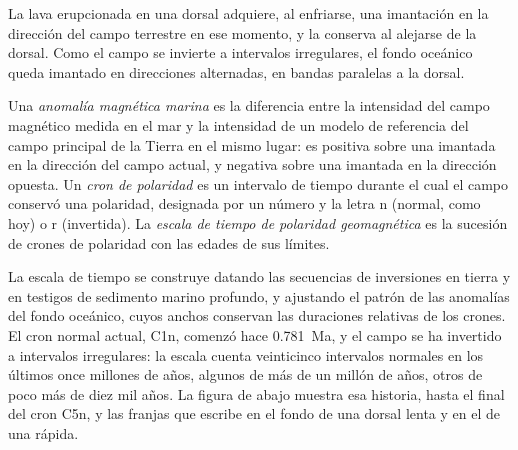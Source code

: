 La lava erupcionada en una dorsal adquiere, al enfriarse, una imantación en la dirección del campo terrestre en ese momento, y la
conserva al alejarse de la dorsal. Como el campo se invierte a intervalos irregulares, el fondo oceánico queda imantado en direcciones
alternadas, en bandas paralelas a la dorsal.

\begin{definition}\label{def:b1:plate-kinematics:magnetic-anomaly}
Una \emph{anomalía magnética marina} es la diferencia entre la intensidad del campo magnético medida en
el mar y la intensidad de un modelo de referencia del campo principal de la Tierra en el mismo lugar: es positiva sobre una 
imantada en la dirección del campo actual, y negativa sobre una  imantada en la dirección opuesta. Un \emph{cron de
polaridad} es un intervalo de tiempo durante el cual el campo conservó una polaridad, designada por un número y
la letra n (normal, como hoy) o r (invertida). La \emph{escala de tiempo de polaridad geomagnética} es la sucesión de crones de polaridad con las edades de sus límites.
\end{definition}

La escala de tiempo se construye datando las secuencias de inversiones en tierra y en testigos de sedimento marino profundo, y
ajustando el patrón de las anomalías del fondo oceánico, cuyos anchos conservan las duraciones relativas de los crones. El cron normal
actual, C1n, comenzó hace \qty{0.781}{Ma}, y el campo se ha invertido a intervalos irregulares: la escala cuenta veinticinco intervalos
normales en los últimos once millones de años, algunos de más de un millón de años, otros de poco más de diez mil años. La figura de
abajo muestra esa historia, hasta el final del cron C5n, y las franjas que escribe en el fondo de una dorsal lenta y en el de una rápida.


